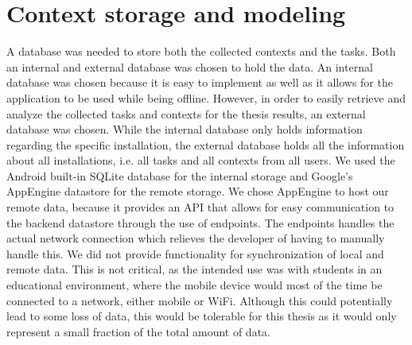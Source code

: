 \section{Context storage and modeling}
A database was needed to store both the collected contexts and the tasks. Both an internal and external database was chosen to hold the data. An internal database was chosen because it is easy to implement as well as it allows for the application to be used while being offline. However, in order to easily retrieve and analyze the collected tasks and contexts for the thesis results, an external database was chosen. While the internal database only holds information regarding the specific installation, the external database holds all the information about all installations, i.e. all tasks and all contexts from all users. We used the Android built-in SQLite database for the internal storage and Google's AppEngine datastore for the remote storage. We chose AppEngine to host our remote data, because it provides an API that allows for easy communication to the backend datastore through the use of endpoints. The endpoints handles the actual network connection which relieves the developer of having to manually handle this. We did not provide functionality for synchronization of local and remote data. This is not critical, as the intended use was with students in an educational environment, where the mobile device would most of the time be connected to a network, either mobile or WiFi. Although this could potentially lead to some loss of data, this would be tolerable for this thesis as it would only represent a small fraction of the total amount of data.

